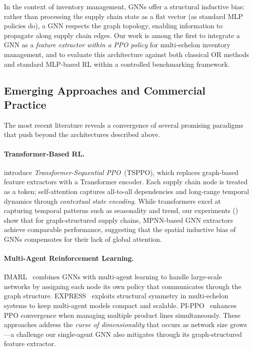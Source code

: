 In the context of inventory management, GNNs offer a structural inductive
bias: rather than processing the supply chain state as a flat vector
(as standard MLP policies do), a GNN respects the graph topology,
enabling information to propagate along supply chain edges. Our work
is among the first to integrate a GNN as a \emph{feature extractor within
a PPO policy} for multi-echelon inventory management, and to evaluate this
architecture against both classical OR methods and standard MLP-based RL
within a controlled benchmarking framework.

\subsection{Emerging Approaches and Commercial Practice}

The most recent literature reveals a convergence of several promising
paradigms that push beyond the architectures described above.

\paragraph{Transformer-Based RL.}
\citet{tsppo2026} introduce \emph{Transformer-Sequential PPO}~(TSPPO),
which replaces graph-based feature extractors with a Transformer encoder.
Each supply chain node is treated as a token; self-attention captures
all-to-all dependencies and long-range temporal dynamics through
\emph{contextual state encoding}. While transformers excel at capturing
temporal patterns such as seasonality and trend, our experiments
() show that for graph-structured supply chains, MPNN-based
GNN extractors achieve comparable performance, suggesting that the spatial
inductive bias of GNNs compensates for their lack of global attention.

\paragraph{Multi-Agent Reinforcement Learning.}
IMARL~\citep{imarl2025} combines GNNs with multi-agent learning to handle
large-scale networks by assigning each node its own policy that communicates
through the graph structure. EXPRESS~\citep{express2026} exploits structural
symmetry in multi-echelon systems to keep multi-agent models compact and
scalable. PI-PPO~\citep{pippo2026} enhances PPO convergence when managing
multiple product lines simultaneously. These approaches address the
\emph{curse of dimensionality} that occurs as network size grows---a challenge
our single-agent GNN also mitigates through its graph-structured
feature extractor.

